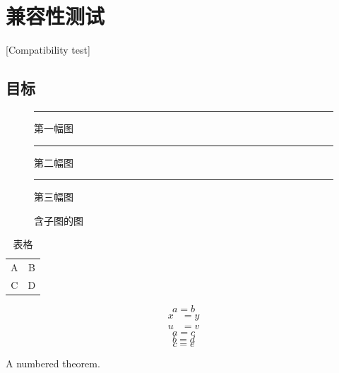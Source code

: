 \newcommand\WiseStd[2]{\par\noindent B-#1-BEGIN #2 B-#1-END\par}

\ifdefined\WiseBook\mainmatter\chapter{兼容性测试}[Compatibility test]\label{chapter}\fi
\section{目标}\label{topic}
\begin{figure}[htbp]\centering\rule{20mm}{3mm}\caption{第一幅图}\label{a}\end{figure}
\begin{figure}[htbp]\centering\rule{20mm}{3mm}\caption{第二幅图}\label{b}\end{figure}
\begin{figure}[htbp]\centering\rule{20mm}{3mm}\caption{第三幅图}\label{c}\end{figure}
\begin{figure}[htbp]\centering
  \subfigure[子图]{\rule{20mm}{3mm}\label{panel}}
  \caption{含子图的图}\label{panels}
\end{figure}
\begin{table}[htbp]\caption{表格}\label{table}\begin{tabular}{cc}A&B\\C&D\end{tabular}\end{table}
\begin{equation}a=b\label{equation}\end{equation}
\begin{align}x&=y\label{line-a}\\u&=v\label{line-b}\end{align}
\ifdefined\WiseTags
  \begin{equation}a=c\tag{S}\label{tagged}\end{equation}
  \begin{equation}b=d\tag*{S}\label{bare}\end{equation}
  \begin{equation}c=e\tag*{7}\label{numeric-tag}\end{equation}
\fi
\begin{theorem}\label{theorem}A numbered theorem.\end{theorem}
